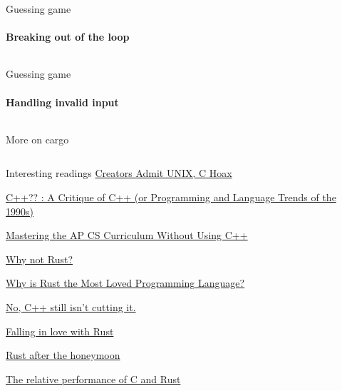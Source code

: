 \documentclass[usenames,dvipsnames,10pt,aspectratio=169]{beamer}
\begin{document}
\begin{frame}{Guessing game}
	\framesubtitle{Breaking out of the loop}
	\inputminted[fontsize=\normalsize]{c}{code/guess6.rs}
\end{frame}

\begin{frame}{Guessing game}
	\framesubtitle{Handling invalid input}
	\inputminted[fontsize=\normalsize]{c}{code/guess7.rs}
\end{frame}

\begin{frame}{More on cargo}
	\inputminted[fontsize=\normalsize]{shell}{code/cargo.sh}
\end{frame}


\begin{frame}{Interesting readings} 
\href{https://web.archive.org/web/19980425023657/http://paul.merton.ox.ac.uk/computing/unix.html}
{Creators Admit UNIX, C Hoax}

\href{https://web.archive.org/web/19990302094922/http://www.elj.com/cppcv3/}
{C++?? : A Critique of C++ (or Programming and Language Trends of the 1990s)}

\href{https://web.archive.org/web/20030625015044/http://www.cs.rice.edu/CS/PLT/Teaching/Talks/TCEA-State-1998/C++/}
{Mastering the AP CS Curriculum Without Using C++}

\href{https://matklad.github.io/2020/09/20/why-not-rust.html}
{Why not Rust?}

\href{https://matklad.github.io/2020/02/14/why-rust-is-loved.html}
{Why is Rust the Most Loved Programming Language?}

\href{https://da-data.blogspot.com/2020/10/no-c-still-isnt-cutting-it.html}
{No, C++ still isn't cutting it.}

\href{http://dtrace.org/blogs/bmc/2018/09/18/falling-in-love-with-rust/}
{Falling in love with Rust}

\href{http://dtrace.org/blogs/bmc/2020/10/11/rust-after-the-honeymoon/}
{Rust after the honeymoon}

\href{http://dtrace.org/blogs/bmc/2018/09/28/the-relative-performance-of-c-and-rust/}
{The relative performance of C and Rust}

\end{frame}
\end{document}
